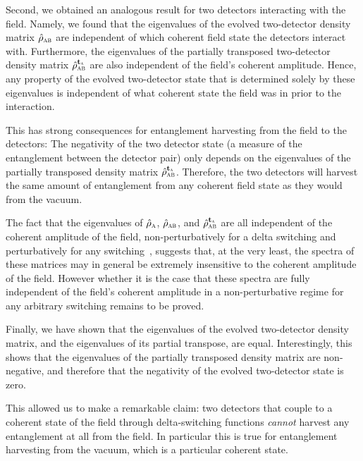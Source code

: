 \documentclass[pra,nofootinbib,floats,aps,twocolumn,tightenlines,superscriptaddress]{revtex4-1}
\newcommand{\rhoa}{\hat{\rho}_\textsc{a}}
\newcommand{\rhoab}{\hat{\rho}_\textsc{ab}}
\newcommand{\rhoabpt}{\hat{\rho}_\textsc{ab}^{{\text{\textbf{t}}}_\textsc{a}}}
\begin{document}
Second, we obtained an analogous result for two detectors interacting with the field. Namely, we found that the eigenvalues of the evolved two-detector density matrix $\rhoab$ are independent of which coherent field state the detectors interact with. Furthermore, the eigenvalues of the partially transposed two-detector density matrix $\rhoabpt$ are also independent of the field's coherent amplitude. Hence, any property of the evolved two-detector state that is determined solely by these eigenvalues is independent of what coherent state the field was in prior to the interaction.

This has strong consequences for entanglement harvesting from the field to the detectors:  The negativity of the two detector state (a measure of the entanglement between the detector pair) only depends on the eigenvalues of the partially transposed density matrix $\rhoabpt$. Therefore, the two detectors will harvest the same amount of entanglement from any coherent field state as they would from the vacuum. 

The fact that the eigenvalues of $\rhoa$, $\rhoab$, and $\rhoabpt$ are all independent of the coherent amplitude of the field, non-perturbatively for a delta switching and perturbatively for any switching~\cite{Simidzija2017b}, suggests that, at the very least, the spectra of these matrices may in general be extremely insensitive to the coherent amplitude of the field. However whether it is the case that these spectra are fully independent of the field's coherent amplitude in a non-perturbative regime for any arbitrary switching remains to be proved.

Finally, we have shown that the eigenvalues of the evolved two-detector density matrix, and the eigenvalues of its partial transpose, are equal. Interestingly, this shows that the eigenvalues of the partially transposed density matrix are non-negative, and therefore that the negativity of the evolved two-detector state is zero.

This allowed us to make a remarkable claim:  two detectors that couple to a coherent state of the field through delta-switching functions \textit{cannot} harvest any entanglement at all from the field. In particular this is true for entanglement harvesting from the vacuum, which is a particular coherent state.
\end{document}
